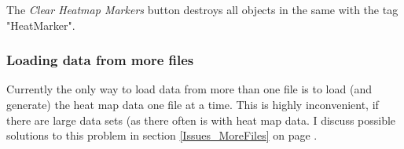 The \textit{Clear Heatmap Markers} button destroys all objects in the same with the tag "HeatMarker". 

\subsubsection{Loading data from more files}
Currently the only way to load data from more than one file is to load (and generate) the heat map data one file at a time. This is highly inconvenient, if there are large data sets (as there often is with heat map data. I discuss possible solutions to this problem in section \ref{Issues_MoreFiles} on page \pageref{Issues_MoreFiles}.